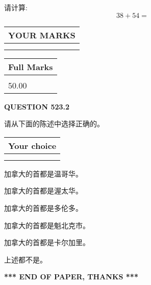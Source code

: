 \documentclass{ctexart}
\begin{document}
  
 
请计算:
\begin{equation}
38 +  %
54 = \nonumber
\end{equation}
 

 

 
  
\vspace{0.2in}
  
\noindent\begin{tabular}{|l|}
\hline
 YOUR MARKS  \\
\hline
 \\ 
 \\ 
\hline
\end{tabular}
\hspace{0.05in} \begin{tabular}{|l|}
\hline
 Full Marks  \\
\hline
 \\ 
50.00 \\
\hline
\end{tabular}
{\textbf{\Large{QUESTION
523.2 
}}}
  
  
请从下面的陈述中选择正确的。
  
  
\noindent\hspace{3.0in} \begin{tabular}{|l|}
\hline
Your choice \\
\hline
 \\ 
 \\ 
\hline
\end{tabular}
  
  
 
 
加拿大的首都是温哥华。
 
 
加拿大的首都是渥太华。
 
 
加拿大的首都是多伦多。
 
 
加拿大的首都是魁北克市。
 
 
加拿大的首都是卡尔加里。
 
 
 上述都不是。
 
 
   
   
 \vspace{0.2in}
 
   
   
   
   
\vspace{1.0in} 
{\textbf{\large{ *** END OF PAPER, THANKS *** }}} 
   
\end{document}
